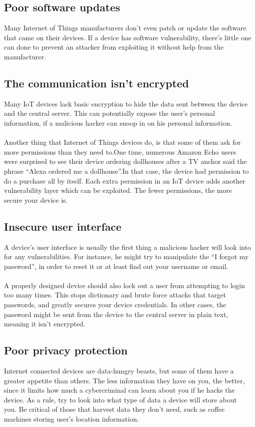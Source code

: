 \subsection{Poor software updates}
Many Internet of Things manufacturers don’t even
patch or update the software that came on their devices.
If a device has software vulnerability, there’s little one
can done to prevent an attacker from exploiting it
without help from the manufacturer.
\subsection{The communication isn’t encrypted}
Many IoT devices lack basic encryption to hide the data
sent between the device and the central server. This can
potentially expose the user’s personal information, if a
malicious hacker can snoop in on his personal
information.
\paragraph{}Another thing that Internet of Things devices do, is that
some of them ask for more permissions than they need
to.One time, numerous Amazon Echo users were
surprised to see their device ordering dollhouses after a
TV anchor said the phrase “Alexa ordered me a
dollhouse”.In that case, the device had permission to do
a purchase all by itself. Each extra permission in an IoT
device adds another vulnerability layer which can be
exploited. The fewer permissions, the more secure your
device is.
\subsection{ Insecure user interface}
A device’s user interface is usually the first thing a
malicious hacker will look into for any vulnerabilities.
For instance, he might try to manipulate the “I forgot
my password”, in order to reset it or at least find out
your username or email.
\paragraph{}A properly designed device should also lock out a user
from attempting to login too many times. This
stops dictionary and brute force attacks that target
passwords, and greatly secures your device credentials.
In other cases, the password might be sent from the
device to the central server in plain text, meaning it isn’t
encrypted. 
\subsection{Poor privacy protection}
Internet connected devices are data-hungry beasts, but
some of them have a greater appetite than others. The
less information they have on you, the better, since it
limits how much a cybercriminal can learn about you if
he hacks the device. As a rule, try to look into what type
of data a device will store about you. Be critical of those
that harvest data they don’t need, such as coffee
machines storing user’s location information.
